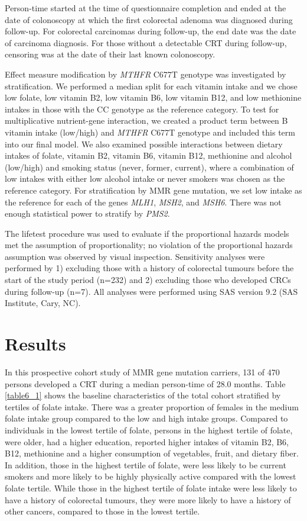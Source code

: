 \noindent Person-time started at the time of questionnaire completion and ended at the date of colonoscopy at which the first colorectal adenoma was diagnosed during follow-up. For colorectal carcinomas during follow-up, the end date was the date of carcinoma diagnosis. For those without a detectable CRT during follow-up, censoring was at the date of their last known colonoscopy.

\noindent Effect measure modification by \emph{MTHFR} C677T genotype was investigated by stratification. We performed a median split for each vitamin intake and we chose low folate, low vitamin B2, low vitamin B6, low vitamin B12, and low methionine intakes in those with the CC genotype as the reference category. To test for multiplicative nutrient-gene interaction, we created a product term between B vitamin intake (low/high) and \emph{MTHFR} C677T genotype and included this term into our final model. We also examined possible interactions between dietary intakes of folate, vitamin B2, vitamin B6, vitamin B12, methionine and alcohol (low/high) and smoking status (never, former, current), where a combination of low intakes with either low alcohol intake or never smokers was chosen as the reference category. For stratification by MMR gene mutation, we set low intake as the reference for each of the genes \emph{MLH1}, \emph{MSH2}, and \emph{MSH6}. There was not enough statistical power to stratify by \emph{
PMS2}.

\noindent The lifetest procedure was used to evaluate if the proportional hazards models met the assumption of proportionality; no violation of the proportional hazards assumption was observed by visual inspection. Sensitivity analyses were performed by 1) excluding those with a history of colorectal tumours before the start of the study period (n=232) and 2) excluding those who developed CRCs during follow-up (n=7). All analyses were performed using SAS version 9.2 (SAS Institute, Cary, NC).

\section[]{Results} %
\noindent In this prospective cohort study of MMR gene mutation carriers, 131 of 470 persons developed a CRT during a median person-time of 28.0 months. Table \ref{table6_1} shows the baseline characteristics of the total cohort stratified by tertiles of folate intake. There was a greater proportion of females in the medium folate intake group compared to the low and high intake groups. Compared to individuals in the lowest tertile of folate, persons in the highest tertile of folate, were older, had a higher education, reported higher intakes of vitamin B2, B6, B12, methionine and a higher consumption of vegetables, fruit, and dietary fiber. In addition, those in the highest tertile of folate, were less likely to be current smokers and more likely to be highly physically active compared with the lowest folate tertile. While those in the highest tertile of folate intake were less likely to have a history of colorectal tumours, they were more likely to have a history of other cancers, compared to those in the lowest tertile.

